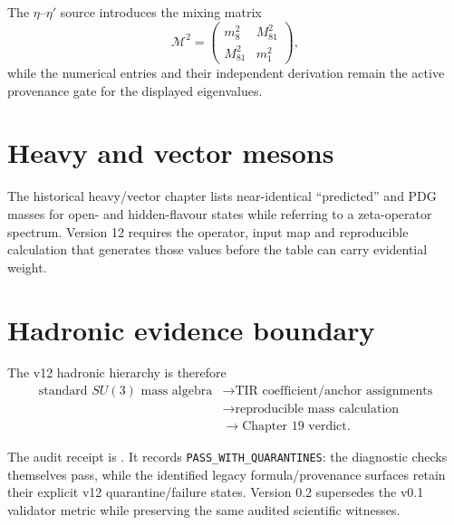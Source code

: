 The $\eta$--$\eta'$ source introduces the mixing matrix
\begin{equation}
\mathcal M^2=
\begin{pmatrix}
m_8^2&M_{81}^2\\
M_{81}^2&m_1^2
\end{pmatrix},
\end{equation}
while the numerical entries and their independent derivation remain the active provenance gate for the displayed eigenvalues.

\section{Heavy and vector mesons}

The historical heavy/vector chapter lists near-identical ``predicted'' and PDG masses for open- and hidden-flavour states while referring to a zeta-operator spectrum. Version 12 requires the operator, input map and reproducible calculation that generates those values before the table can carry evidential weight.

\section{Hadronic evidence boundary}

The v12 hadronic hierarchy is therefore
\[
\boxed{\begin{aligned}
\text{standard }SU(3)\text{ mass algebra}
&\to \text{TIR coefficient/anchor assignments}\\
&\to \text{reproducible mass calculation}\\
&\to \text{Chapter 19 verdict}.
\end{aligned}}
\]

The audit receipt is
. It records \texttt{PASS\_WITH\_QUARANTINES}: the diagnostic checks themselves pass, while the identified legacy formula/provenance surfaces retain their explicit v12 quarantine/failure states. Version 0.2 supersedes the v0.1 validator metric while preserving the same audited scientific witnesses.
